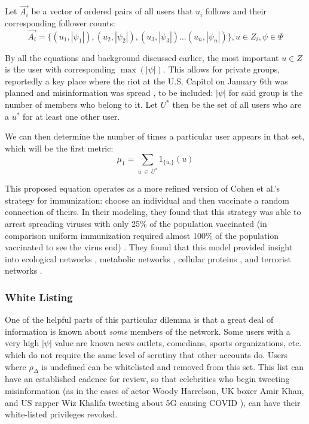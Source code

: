 \documentclass[preprint,review,12pt]{elsarticle}
\begin{document}
Let $\vec{A_i}$ be a vector of ordered pairs of all users that $u_i$ follows and their corresponding follower counts:
\begin{equation} 
\label{row of adjacency matrix}
\vec{A_i}=\{(u_1,|\psi_1|),(u_2,|\psi_2|),(u_3,|\psi_3|)\dots (u_n,|\psi_n|)\}, u \in Z_i, \psi \in \Psi
\end{equation}

By all the equations and background discussed earlier, the most important $u \in Z$ is the user with corresponding $\max(|\psi|)$. This allows for private groups, reportedly a key place where the riot at the U.S. Capitol on January 6th was planned and misinformation was spread \cite{yin2021facebook,horwitz2020facebook}, to be included: $|\psi|$ for said group is the number of members who belong to it. 
Let $U^*$ then be the set of all users who are a $u^*$ for at least one other user.

We can then determine the number of times a particular user appears in that set, which will be the first metric: 
\begin{equation}
\label{mu_1 equation}
    \mu_1 = \sum_{u\ \in \ U^*}1_{\{u_i\}}(u)
\end{equation}

This proposed equation operates as a more refined version of Cohen et al.'s strategy for immunization: choose an individual and then vaccinate a random connection of theirs. In their modeling, they found that this strategy was able to arrest spreading viruses with only 25\% of the population vaccinated (in comparison uniform immunization required almost 100\% of the population vaccinated to see the virus end) \cite{cohen2003efficient}. They found that this model provided insight into ecological networks \cite{sole2001complexity,camacho2002robust}, metabolic networks \cite{jeong2000large}, cellular proteins \cite{jeong2001lethality}, and terrorist networks \cite{cohen2003efficient}. 

\subsubsection{White Listing}
\label{sec: white listing}
One of the helpful parts of this particular dilemma is that a great deal of information is known about \textit{some} members of the network. Some users with a very high $|\psi|$ value are known news outlets, comedians, sports organizations, etc. which do not require the same level of scrutiny that other accounts do. Users where $\rho_{\Delta}$ is undefined can be whitelisted and removed from this set. This list can have an established cadence for review, so that celebrities who begin tweeting misinformation (as in the cases of actor Woody Harrelson, UK boxer Amir Khan, and US rapper Wiz Khalifa tweeting about 5G causing COVID \cite{bruns2020covid19}), can have their white-listed privileges revoked. 
\end{document}
